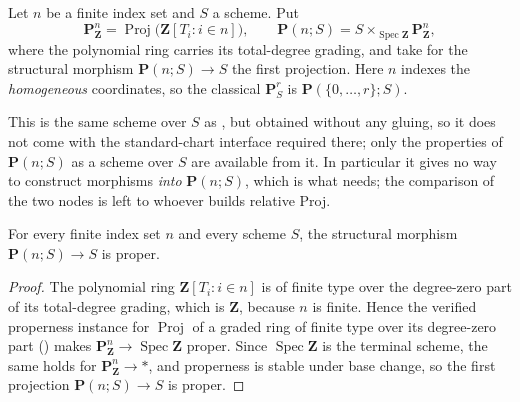 \begin{definition}
  \label{def:nagata-projective-space-base-change}
  \leanok

  Let $n$ be a finite index set and $S$ a scheme.  Put
  \[
    \mathbf P^n_{\mathbf Z}
      =\operatorname{Proj}\bigl(\mathbf Z[T_i:i\in n]\bigr),
    \qquad
    \mathbf P(n;S)
      =S\times_{\operatorname{Spec}\mathbf Z}\mathbf P^n_{\mathbf Z},
  \]
  where the polynomial ring carries its total-degree grading, and take for the
  structural morphism $\mathbf P(n;S)\to S$ the first projection.  Here $n$
  indexes the \emph{homogeneous} coordinates, so the classical
  $\mathbf P^r_S$ is $\mathbf P(\{0,\dots,r\};S)$.

  This is the same scheme over $S$ as
  , but obtained without any
  gluing, so it does not come with the standard-chart interface required
  there; only the properties of $\mathbf P(n;S)$ as a scheme over $S$ are
  available from it.  In particular it gives no way to construct morphisms
  \emph{into} $\mathbf P(n;S)$, which is what
   needs; the
  comparison of the two nodes is left to whoever builds relative Proj.
\end{definition}

\begin{lemma}
  \label{lemma:nagata-projective-space-base-change-proper}
  \leanok

  For every finite index set $n$ and every scheme $S$, the structural
  morphism $\mathbf P(n;S)\to S$ is proper.
\end{lemma}

\begin{proof}
  \leanok
  The polynomial ring $\mathbf Z[T_i:i\in n]$ is of finite type over the
  degree-zero part of its total-degree grading, which is $\mathbf Z$, because
  $n$ is finite.  Hence the verified properness instance for
  $\operatorname{Proj}$ of a graded ring of finite type over its degree-zero
  part () makes
  $\mathbf P^n_{\mathbf Z}\to\operatorname{Spec}\mathbf Z$ proper.  Since
  $\operatorname{Spec}\mathbf Z$ is the terminal scheme, the same holds for
  $\mathbf P^n_{\mathbf Z}\to\ast$, and properness is stable under base
  change, so the first projection $\mathbf P(n;S)\to S$ is proper.
\end{proof}

